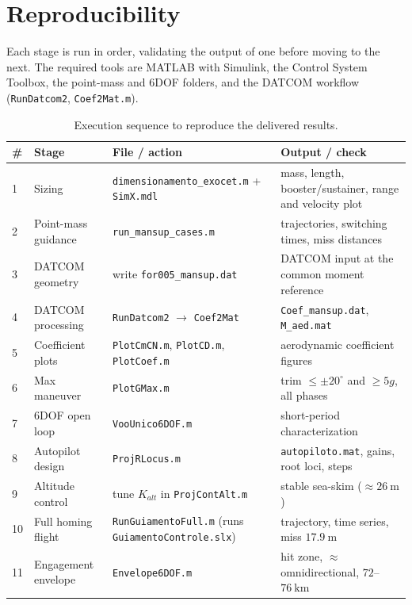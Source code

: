 \section{Reproducibility}

Each stage is run in order, validating the output of one before moving to the next. The required tools are MATLAB with Simulink, the Control System Toolbox, the point-mass and 6DOF folders, and the DATCOM workflow (\texttt{RunDatcom2}, \texttt{Coef2Mat.m}).

\begin{table}[H]
\centering
\small
\caption{Execution sequence to reproduce the delivered results.}
\begin{tabular}{p{}p{}p{}p{}}
\toprule
\# & Stage & File / action & Output / check \\
\midrule
1  & Sizing & \texttt{dimensionamento\_exocet.m} + \texttt{SimX.mdl} & mass, length, booster/sustainer, range and velocity plot \\
2  & Point-mass guidance & \texttt{run\_mansup\_cases.m} & trajectories, switching times, miss distances \\
3  & DATCOM geometry & write \texttt{for005\_mansup.dat} & DATCOM input at the common moment reference \\
4  & DATCOM processing & \texttt{RunDatcom2} $\rightarrow$ \texttt{Coef2Mat} & \texttt{Coef\_mansup.dat}, \texttt{M\_aed.mat} \\
5  & Coefficient plots & \texttt{PlotCmCN.m}, \texttt{PlotCD.m}, \texttt{PlotCoef.m} & aerodynamic coefficient figures \\
6  & Max maneuver & \texttt{PlotGMax.m} & trim $\leq\pm 20^\circ$ and $\geq 5g$, all phases \\
7  & 6DOF open loop & \texttt{VooUnico6DOF.m} & short-period characterization \\
8  & Autopilot design & \texttt{ProjRLocus.m} & \texttt{autopiloto.mat}, gains, root loci, steps \\
9  & Altitude control & tune $K_{alt}$ in \texttt{ProjContAlt.m} & stable sea-skim ($\approx 26~\text{m}$) \\
10 & Full homing flight & \texttt{RunGuiamentoFull.m} (runs \texttt{GuiamentoControle.slx}) & trajectory, time series, miss $17.9~\text{m}$ \\
11 & Engagement envelope & \texttt{Envelope6DOF.m} & hit zone, $\approx$ omnidirectional, $72$--$76~\text{km}$ \\
\bottomrule
\end{tabular}
\end{table}

